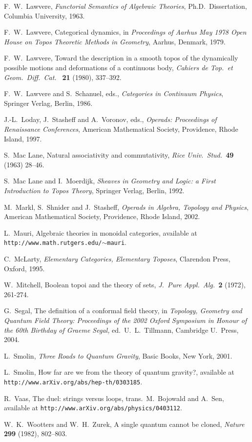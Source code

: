 \documentclass{article}
\begin{document}
\begin{thebibliography}{99}
 F.\ W.\ Lawvere, {\sl Functorial Semantics of 
Algebraic Theories}, Ph.D.\ Dissertation, Columbia University, 1963.

 F.\ W.\ Lawvere, Categorical dynamics, in
{\sl Proceedings of Aarhus May 1978 Open House on Topos Theoretic 
Methods in Geometry}, Aarhus, Denmark, 1979. 

F.\ W.\ Lawvere, Toward the description in a smooth topos of the 
dynamically possible motions and deformations of a continuous body, 
{\sl Cahiers de Top.\ et Geom.\ Diff.\ Cat.\ } {\bf 21} (1980), 337--392. 

  F.\ W.\ Lawvere and S.\ Schanuel, eds., 
{\sl Categories in Continuum Physics}, Springer Verlag, Berlin, 1986. 

 J.-L.\ Loday, J.\ Stasheff and A.\ Voronov, eds.,
{\sl Operads: Proceedings of Renaissance Conferences}, American
Mathematical Society, Providence, Rhode Island, 1997.

 S.\ Mac Lane, Natural associativity and 
commutativity, {\sl Rice Univ.\ Stud.\ }{\bf 49} (1963) 28--46.
 
 S.\ Mac Lane and I.\ Moerdijk, {\sl Sheaves in 
Geometry and Logic: a First Introduction to Topos Theory}, 
Springer Verlag, Berlin, 1992.

 M.\ Markl, S.\ Shnider and J.\ Stasheff,
{\sl Operads in Algebra, Topology and Physics}, American
Mathematical Society, Providence, Rhode Island, 2002.

 L.\ Mauri, Algebraic theories in monoidal categories,
available at \hfill \break \texttt{http://www.math.rutgers.edu/$\sim$mauri}.

 C.\ McLarty, {\sl Elementary Categories, 
Elementary Toposes}, Clarendon Press, Oxford, 1995.

 W.\ Mitchell, Boolean topoi and the
theory of sets, {\sl J.\ Pure Appl.\ Alg.\ }{\bf 2} (1972), 
261-274.

 G.\ Segal, The definition of a conformal field theory, 
in {\sl Topology, Geometry and Quantum Field Theory: Proceedings of the 
2002 Oxford Symposium in Honour of the 60th Birthday of Graeme Segal,} 
ed.\ U.\ L.\ Tillmann, Cambridge U.\ Press, 2004.

 L.\ Smolin, {\sl Three Roads to Quantum Gravity}, 
Basic Books, New York, 2001.

L.\ Smolin, How far are we from the theory of quantum
gravity?, available at \texttt{http://www.arXiv.org/abs/hep-th/0303185}.

 R.\ Vaas, The duel: strings versus loops, trans.\
M.\ Bojowald and A.\ Sen, available at 
\texttt{http://www.arXiv.org/abs/physics/0403112}.

 W.\ K.\ Wootters and W.\ H.\ Zurek,
A single quantum cannot be cloned, {\sl Nature} {\bf 299} 
(1982), 802--803. 

\end{thebibliography}
\end{document}
